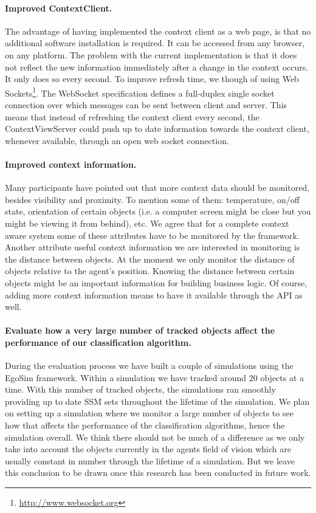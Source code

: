 \paragraph{Improved ContextClient.} The advantage of having implemented the context client as a web page, is that no additional software installation is required. It can be accessed from any browser, on any platform. The problem with the current implementation is that it does not reflect the new information immediately after a change in the context occurs. It only does so every second. To improve refresh time, we though of using Web Sockets\footnote{\url{http://www.websocket.org}}. The WebSocket specification defines a full-duplex single socket connection over which messages can be sent between client and server. This means that instead of refreshing the context client every second, the ContextViewServer could push up to date information towards the context client, whenever available, through an open web socket connection.

\paragraph{Improved context information.} Many participants have pointed out that more context data should be monitored, besides visibility and proximity. To mention some of them: temperature, on/off state, orientation of certain objects (i.e. a computer screen might be close but you might be viewing it from behind), etc. We agree that for a complete context aware system some of these attributes have to be monitored by the framework. Another attribute useful context information we are interested in monitoring is the distance between objects. At the moment we only monitor the distance of objects relative to the agent's position. Knowing the distance between certain objects might be an important information for building business logic. Of course, adding more context information means to have it available through the API as well.\\

\paragraph{Evaluate how a very large number of tracked objects affect the performance of our classification algorithm.} During the evaluation process we have built a couple of simulations using the EgoSim framework. Within a simulation we have tracked around 20 objects at a time. With this number of tracked objects, the simulations ran smoothly providing up to date SSM sets throughout the lifetime of the simulation. We plan on setting up a simulation where we monitor a large number of objects to see how that affects the performance of the classification algorithms, hence the simulation overall. We think there should not be much of a difference as we only take into account the objects currently in the agents field of vision which are usually constant in number through the lifetime of a simulation. But we leave this conclusion to be drawn once this research has been conducted in future work.

